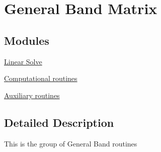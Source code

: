 \hypertarget{group__GB}{}\section{General Band Matrix}
\label{group__GB}
\subsection*{Modules}
\begin{DoxyCompactItemize}
\item 
\hyperlink{group__solveGB}{Linear Solve}
\item 
\hyperlink{group__computationalGB}{Computational routines}
\item 
\hyperlink{group__auxiliaryGB}{Auxiliary routines}
\end{DoxyCompactItemize}


\subsection{Detailed Description}
This is the group of General Band routines 